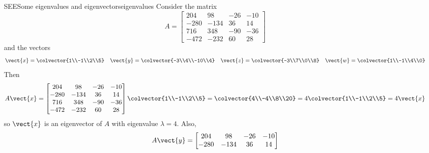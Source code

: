 \begin{example}{SEE}{Some eigenvalues and eigenvectors}{eigenvalues}
Consider the matrix
%
\begin{equation*}
A=
\begin{bmatrix}
204 & 98 & -26 & -10\\ 
-280 & -134 & 36 & 14\\ 
716 & 348 & -90 & -36\\ 
-472 & -232 & 60 & 28
\end{bmatrix}
\end{equation*}
%
and the vectors
%
\begin{align*}
\vect{x}=\colvector{1\\-1\\2\\5}&&     %
\vect{y}=\colvector{-3\\4\\-10\\4}&&  %
\vect{z}=\colvector{-3\\7\\0\\8}&&     %
\vect{w}=\colvector{1\\-1\\4\\0}        %
\end{align*}
%
Then
%
\begin{equation*}
A\vect{x}=
\begin{bmatrix}
204 & 98 & -26 & -10\\ 
-280 & -134 & 36 & 14\\ 
716 & 348 & -90 & -36\\ 
-472 & -232 & 60 & 28
\end{bmatrix}
\colvector{1\\-1\\2\\5}=
\colvector{4\\-4\\8\\20}=
4\colvector{1\\-1\\2\\5}=4\vect{x}
%
\end{equation*}
%
so $\vect{x}$ is an eigenvector of $A$ with eigenvalue $\lambda=4$.  Also,
%
\begin{equation*}
A\vect{y}=
\begin{bmatrix}
204 & 98 & -26 & -10\\ 
-280 & -134 & 36 & 14\\ 

\end{bmatrix}
\end{equation*}
\end{example}
